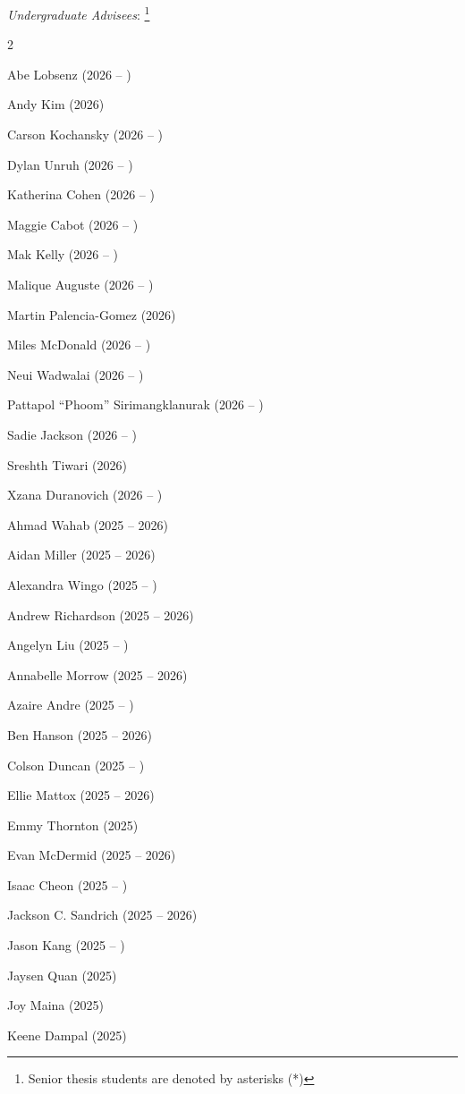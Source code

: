 \documentclass[11pt, a4paper]{article} %
\newcommand\blfootnote[1]{%
  \begingroup
  \renewcommand\thefootnote{}\footnote{#1}%
  \addtocounter{footnote}{-1}%
  \endgroup
}
\begin{document}
\textit{Undergraduate Advisees}:
\blfootnote{Senior thesis students are denoted by asterisks
  (*)}
\begin{multicols}{2}
\begin{etaremune}
  \item Abe Lobsenz (2026 -- )
  \item Andy Kim (2026)
  \item Carson Kochansky (2026 -- )
  \item Dylan Unruh (2026 -- )
  \item Katherina Cohen (2026 -- )
  \item Maggie Cabot (2026 -- )
  \item Mak Kelly (2026 -- )
  \item Malique Auguste (2026 -- )
  \item Martin Palencia-Gomez (2026)
  \item Miles McDonald (2026 -- )
  \item Neui Wadwalai (2026 -- )
  \item Pattapol ``Phoom'' Sirimangklanurak (2026 -- )
  \item Sadie Jackson (2026 -- )
  \item Sreshth Tiwari (2026)
  \item Xzana Duranovich (2026 -- )
  \item Ahmad Wahab (2025 -- 2026)
  \item Aidan Miller (2025 -- 2026)
  \item Alexandra Wingo (2025 -- )
  \item Andrew Richardson (2025 -- 2026)
  \item Angelyn Liu (2025 -- )
  \item Annabelle Morrow (2025 -- 2026)
  \item Azaire Andre (2025 -- )
  \item Ben Hanson (2025 -- 2026)
  \item Colson Duncan (2025 -- )
  \item Ellie Mattox (2025 -- 2026)
  \item Emmy Thornton (2025)
  \item Evan McDermid (2025 -- 2026)
  \item Isaac Cheon (2025 -- )
  \item Jackson C. Sandrich (2025 -- 2026)
  \item Jason Kang (2025 -- )
  \item Jaysen Quan (2025)
  \item Joy Maina (2025)
  \item Keene Dampal (2025)

\end{etaremune}
\end{multicols}
\end{document}

